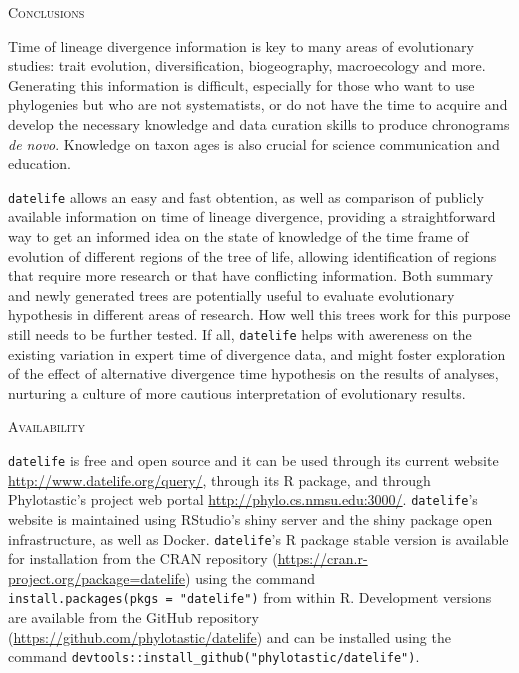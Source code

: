 \documentclass[]{article}
\begin{document}
\begin{center}
\textsc{Conclusions}
\end{center}

Time of lineage divergence information is key to many areas of evolutionary studies: trait evolution,
diversification, biogeography, macroecology and more. Generating this information is difficult,
especially for those who want to use phylogenies but who are not systematists, or
do not have the time to acquire and develop the necessary knowledge and data curation skills
to produce chronograms \emph{de novo}. Knowledge on taxon ages is also crucial for
science communication and education.

\texttt{datelife} allows an easy and fast obtention, as well as comparison of publicly available information
on time of lineage divergence, providing a straightforward way to get an informed idea on the state of knowledge of the time frame of evolution of different regions of the tree of life, allowing identification of regions that require more research or that have conflicting information.
Both summary and newly generated trees are potentially useful to evaluate evolutionary hypothesis in different areas of research. How well this trees work for this purpose still needs to be further tested. If all, \texttt{datelife} helps with awereness on the existing variation in expert time of divergence data, and might foster exploration of the effect of alternative divergence time hypothesis on the results of analyses, nurturing a culture of more cautious interpretation of evolutionary results.

\begin{center}
\textsc{Availability}
\end{center}

\texttt{datelife} is free and open source and it can be used through its current website
\url{http://www.datelife.org/query/}, through its R package, and through Phylotastic's project web portal \url{http://phylo.cs.nmsu.edu:3000/}.
\texttt{datelife}'s website is maintained using RStudio's shiny server and the shiny package open infrastructure, as well as Docker.
\texttt{datelife}'s R package stable version is available
for installation from the CRAN repository (\url{https://cran.r-project.org/package=datelife})
using the command \texttt{install.packages(pkgs\ =\ "datelife")} from within R. Development versions
are available from the GitHub repository (\url{https://github.com/phylotastic/datelife})
and can be installed using the command \texttt{devtools::install\_github("phylotastic/datelife")}.
\end{document}
